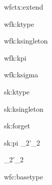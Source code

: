 \documentclass{article}
\theoremstyle{break}
\begin{document}
\infrule
  {}
  {\validcontext{\emptycontext}}

  {wfctx:extend}
  {\validkind{\context}{\kind}\qquad
     \cvar\not\in\BV{\context}}
  {\validcontext{\emptycontext,\sbindconstructor{\cvar}{\kind}}}



  {wfk:ktype}
  {\validcontext{\context}}
  {\validkind{\context}{\ktype}}

  {wfk:ksingleton}
  {\validconstructor{\context}{\constructor}{\ktype}}
  {\validkind{\context}{\ksingleton{\constructor}}}

  {wfk:kpi}
  {\qquad
   }
  {}

  {wfk:ksigma}
  {\qquad
   }
  {\validkind{\context}
     {}}


  {sk:ktype}
  {\validcontext{\context}}
  {\subkind{\context}{\ktype}{\ktype}}

  {sk:ksingleton}
  {}
  {
     {}}


  {sk:forget}
  {\validkind{\context}{\ksingleton{\constructor}}}
  {\subkind{\context}{\ksingleton{\constructor}}{\ktype}}

  {sk:pi}
  {\qquad
                {\kind_2}{\kind'_2}}
  {\subkind{\context}
      {}
      {}}

\infrule
  {\quad
        {\kind_2}{\kind'_2}}
  {\subkind{\context}
     {}
     {}}

   {\validconstructor{\context}{\constructor}{\kind}}

  {wfc:basetype}
  {\validcontext{\context}}
  {\validconstructor{\context}{\basetype}{\ktype}}
\end{document}
